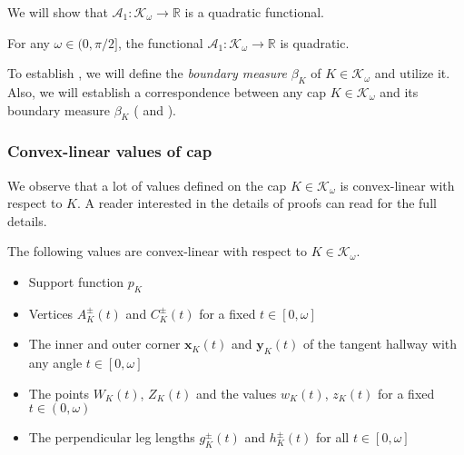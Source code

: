 We will show that \(\mathcal{A}_1 : \mathcal{K}_\omega \to \mathbb{R}\) is a quadratic functional.

\begin{theorem}

For any \(\omega \in (0, \pi/2]\), the functional \(\mathcal{A}_1 : \mathcal{K}_{\omega} \to \mathbb{R}\) is quadratic.

\label{thm:a1-quadratic}
\end{theorem}

To establish , we will define the \emph{boundary measure} \(\beta_K\) of \(K \in \mathcal{K}_\omega\) and utilize it. Also, we will establish a correspondence between any cap \(K \in \mathcal{K}_\omega\) and its boundary measure \(\beta_K\) ( and ).

\subsubsection{Convex-linear values of cap}

We observe that a lot of values defined on the cap \(K \in \mathcal{K}_\omega\) is convex-linear with respect to \(K\). A reader interested in the details of proofs can read  for the full details.

\begin{theorem}

The following values are convex-linear with respect to \(K \in \mathcal{K}_\omega\).

\begin{itemize}
\tightlist
\item
  Support function \(p_K\)
\item
  Vertices \(A^{\pm}_K(t)\) and \(C^{\pm}_K(t)\) for a fixed \(t \in [0, \omega]\)
\item
  The inner and outer corner \(\mathbf{x}_K(t)\) and \(\mathbf{y}_K(t)\) of the tangent hallway with any angle \(t \in [0, \omega]\)
\item
  The points \(W_K(t)\), \(Z_K(t)\) and the values \(w_K(t)\), \(z_K(t)\) for a fixed \(t \in (0, \omega)\)
\item
  The perpendicular leg lengths \(g^{\pm}_K(t)\) and \(h^{\pm}_K(t)\) for all \(t \in [0, \omega]\)
\end{itemize}

\label{thm:cap-convex-linear}
\end{theorem}

